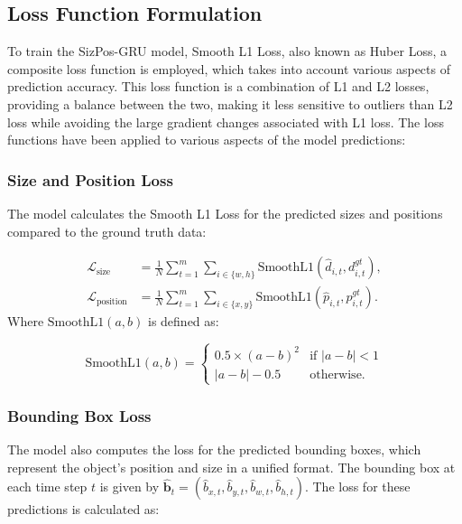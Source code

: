 \documentclass[12pt,oneside]{book} %
\begin{document}
\newpage
\subsection{Loss Function Formulation}
To train the SizPos-GRU model, Smooth L1 Loss, also known as Huber Loss, a
composite loss function is employed, which takes into account various aspects
of prediction accuracy. This loss function is a combination of L1 and L2
losses, providing a balance between the two, making it less sensitive to
outliers than L2 loss while avoiding the large gradient changes associated with
L1 loss. The loss functions have been applied to various aspects of the model
predictions:

\subsubsection*{Size and Position Loss}
\noindent The model calculates the Smooth L1 Loss for the predicted sizes and positions compared to the ground truth data:

\begin{align}
    \mathcal{L}_{\text{size}}     & = \frac{1}{N} \sum_{t=1}^{m} \sum_{i \in \{w, h\}} \text{SmoothL1}\left(\hat{d}_{i,t}, d^{gt}_{i,t}\right),  \\
    \mathcal{L}_{\text{position}} & = \frac{1}{N} \sum_{t=1}^{m} \sum_{i \in \{x, y\}} \text{SmoothL1}\left(\hat{p}_{i,t}, p^{gt}_{i,t}\right).
\end{align}
Where \(\text{SmoothL1}(a, b)\) is defined as:

\begin{equation}
    \text{SmoothL1}(a, b) =
    \begin{cases} 
        0.5 \times (a - b)^2 & \text{if } |a - b| < 1 \\
        |a - b| - 0.5        & \text{otherwise}.
    \end{cases}
\end{equation}

\subsubsection*{Bounding Box Loss}
\noindent The model also computes the loss for the predicted bounding boxes, which represent the object's position and size in a unified format. The bounding box at each time step \(t\) is given by \(\hat{\mathbf{b}}_t = (\hat{b}_{x,t}, \hat{b}_{y,t}, \hat{b}_{w,t}, \hat{b}_{h,t})\). The loss for these predictions is calculated as:
\end{document}
